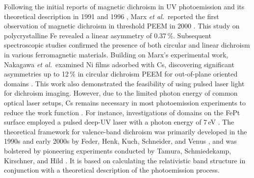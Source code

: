 \documentclass[prl,twocolumn,floatfix]{revtex4-2}
\begin{document}
 Following the initial reports of magnetic dichroism in UV photoemission and its theoretical description in 1991 and 1996 \cite{schneider1991,henk1996,feder1996}, Marx \textit{et al.}\ reported the first observation of magnetic dichroism in threshold PEEM in 2000 \cite{marx2000}. This study on polycrystalline Fe revealed a linear asymmetry of 0.37\,\%. 
Subsequent spectroscopic studies confirmed the presence of both circular and linear dichroism in various ferromagnetic materials. Building on Marx's experimental work, Nakagawa \textit{et al.}\ examined Ni films adsorbed with Cs, discovering significant asymmetries up to 12\,\% in circular dichroism PEEM for out-of-plane oriented domains \cite{nakagawa2007,nakagawa2009,nakagawa2012}. This work also demonstrated the feasibility of using pulsed laser light for dichroism imaging. However, due to the limited photon energy of common optical laser setups, Cs remains necessary in most photoemission experiments to reduce the work function \cite{kronseder2011, meier2017}. For instance, investigations of domains on the FePt surface employed a pulsed deep-UV laser with a photon energy of 7\,eV \cite{zhao2019}. 
The theoretical framework for valence-band dichroism was primarily developed in the 1990s and early 2000s by Feder, Henk, Kuch, Schneider, and Venus \cite{feder1996,henk1996,kuch1996a,kuch2001,venus1994,venus1997}, and was bolstered by pioneering experiments conducted by Tamura, Schmiedekamp, Kirschner, and Hild \cite{tamura1987, schmiedeskamp1988, venus95, hild2008, hild2009, hild2010}. It is based on calculating the relativistic band structure in conjunction with a theoretical description of the photoemission process. 
\end{document}
